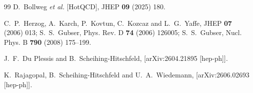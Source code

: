 \documentclass[final,3p,times]{elsarticle}
\begin{document}
\begin{thebibliography}{99}
D.~Bollweg \textit{et al.} [HotQCD],
JHEP \textbf{09} (2025) 180.


C.~P.~Herzog, A.~Karch, P.~Kovtun, C.~Kozcaz and L.~G.~Yaffe,
JHEP \textbf{07} (2006) 013;
S.~S.~Gubser,
Phys. Rev. D \textbf{74} (2006) 126005;
S.~S.~Gubser,
Nucl. Phys. B \textbf{790} (2008) 175--199.

J.~F.~Du Plessis and B.~Scheihing-Hitschfeld,
[arXiv:2604.21895 [hep-ph]].

K.~Rajagopal, B.~Scheihing-Hitschfeld and U.~A.~Wiedemann,
[arXiv:2606.02693 [hep-ph]].

\end{thebibliography}



\end{document}
